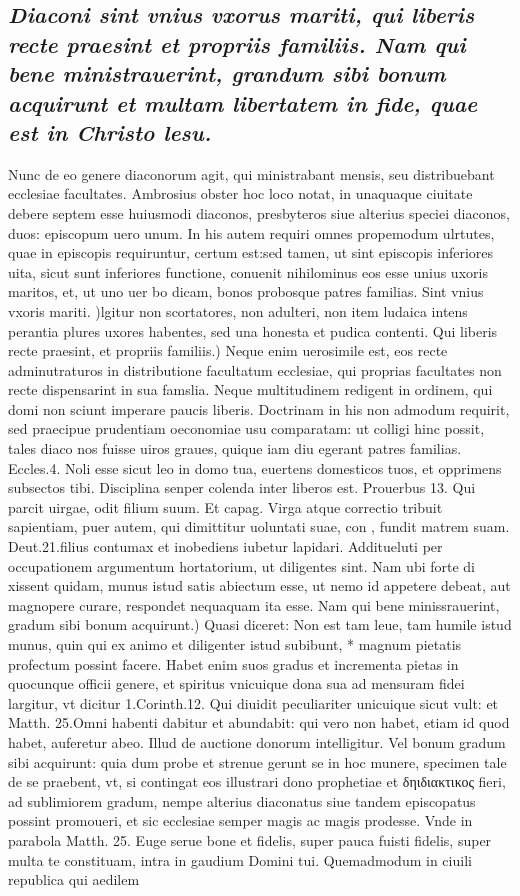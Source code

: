\documentclass{article}
\begin{document}
\begin{pages}
\subsection*{\textit{Diaconi sint vnius vxorus mariti, qui liberis recte praesint et propriis familiis. Nam qui bene ministrauerint, grandum sibi bonum acquirunt et multam libertatem in fide, quae est in Christo lesu. }}\pstart Nunc de eo genere diaconorum agit, qui ministrabant mensis, seu distribuebant ecclesiae facultates. Ambrosius obster hoc loco notat, in unaquaque ciuitate debere septem esse huiusmodi diaconos, presbyteros siue alterius speciei diaconos, duos: episcopum uero unum. In his autem requiri omnes propemodum ulrtutes, quae in episcopis requiruntur, certum est:sed tamen, ut sint episcopis inferiores uita, sicut sunt inferiores functione, conuenit nihilominus eos esse unius uxoris maritos, et, ut uno uer bo dicam, bonos probosque patres familias.  \pend\pstart Sint vnius vxoris mariti. )lgitur non scortatores, non adulteri, non item ludaica intens perantia plures uxores habentes, sed una honesta et pudica contenti.  \pend\pstart Qui liberis recte praesint, et propriis familiis.) Neque enim uerosimile est, eos recte adminutraturos in distributione facultatum ecclesiae, qui proprias facultates non recte dispensarint in sua famslia. Neque multitudinem redigent in ordinem, qui domi non sciunt imperare paucis liberis. Doctrinam in his non admodum requirit, sed praecipue prudentiam oeconomiae usu comparatam: ut colligi hinc possit, tales diaco nos fuisse uiros graues, quique iam diu egerant patres familias. Eccles.4. Noli esse sicut leo in domo tua, euertens domesticos tuos, et opprimens subsectos tibi. Disciplina senper colenda inter liberos est. Prouerbus 13. Qui parcit uirgae, odit filium suum. Et capag. Virga atque correctio tribuit sapientiam, puer autem, qui dimittitur uoluntati suae, con , fundit matrem suam. Deut.21.filius contumax et inobediens iubetur lapidari. Additueluti per occupationem argumentum hortatorium, ut diligentes sint. Nam ubi forte di xissent quidam, munus istud satis abiectum esse, ut nemo id appetere debeat, aut magnopere curare, respondet nequaquam ita esse.  \pend\pstart Nam qui bene minissrauerint, gradum sibi bonum acquirunt.) Quasi diceret: Non  est tam leue, tam humile istud munus, quin qui ex animo et diligenter istud subibunt, * magnum pietatis profectum possint facere. Habet enim suos gradus et incrementa pietas in quocunque officii genere, et spiritus vnicuique dona sua ad mensuram fidei largitur, vt dicitur 1.Corinth.12. Qui diuidit peculiariter unicuique sicut vult: et Matth. 25.Omni habenti dabitur et abundabit: qui vero non habet, etiam id quod habet, auferetur abeo. Illud de auctione donorum intelligitur. Vel bonum gradum sibi acquirunt: quia dum probe et strenue gerunt se in hoc munere, specimen tale de se praebent, vt, si contingat eos illustrari dono prophetiae et δηιδιακτικος fieri, ad sublimiorem gradum, nempe alterius diaconatus siue tandem episcopatus possint promoueri, et sic ecclesiae semper magis ac magis prodesse. Vnde in parabola Matth. 25. Euge serue bone et fidelis, super pauca fuisti fidelis, super multa te constituam, intra in gaudium Domini tui. Quemadmodum in ciuili republica qui aedilem 
\end{pages}
\end{document}
